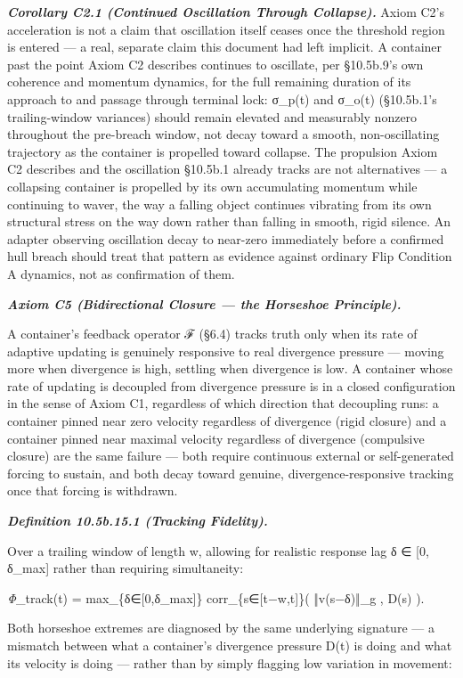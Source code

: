 \documentclass[
]{article}
\begin{document}
\emph{\textbf{Corollary C2.1 (Continued Oscillation Through Collapse).}}
Axiom C2's acceleration is not a claim that oscillation itself ceases
once the threshold region is entered --- a real, separate claim this
document had left implicit. A container past the point Axiom C2
describes continues to oscillate, per §10.5b.9's own coherence and
momentum dynamics, for the full remaining duration of its approach to
and passage through terminal lock: σ\_p(t) and σ\_o(t) (§10.5b.1's
trailing-window variances) should remain elevated and measurably nonzero
throughout the pre-breach window, not decay toward a smooth,
non-oscillating trajectory as the container is propelled toward
collapse. The propulsion Axiom C2 describes and the oscillation §10.5b.1
already tracks are not alternatives --- a collapsing container is
propelled by its own accumulating momentum while continuing to waver,
the way a falling object continues vibrating from its own structural
stress on the way down rather than falling in smooth, rigid silence. An
adapter observing oscillation decay to near-zero immediately before a
confirmed hull breach should treat that pattern as evidence against
ordinary Flip Condition A dynamics, not as confirmation of them.

\emph{\textbf{Axiom C5 (Bidirectional Closure --- the Horseshoe
Principle).}}

A container's feedback operator ℱ (§6.4) tracks truth only when its rate
of adaptive updating is genuinely responsive to real divergence pressure
--- moving more when divergence is high, settling when divergence is
low. A container whose rate of updating is decoupled from divergence
pressure is in a closed configuration in the sense of Axiom C1,
regardless of which direction that decoupling runs: a container pinned
near zero velocity regardless of divergence (rigid closure) and a
container pinned near maximal velocity regardless of divergence
(compulsive closure) are the same failure --- both require continuous
external or self-generated forcing to sustain, and both decay toward
genuine, divergence-responsive tracking once that forcing is withdrawn.

\emph{\textbf{Definition 10.5b.15.1 (Tracking Fidelity).}}

Over a trailing window of length w, allowing for realistic response lag
δ ∈ {[}0, δ\_max{]} rather than requiring simultaneity:

\emph{Φ}\_track(t) = max\_\{δ∈{[}0,δ\_max{]}\} corr\_\{s∈{[}t−w,t{]}\}(
‖v(s−δ)‖\_g , D(s) ).

Both horseshoe extremes are diagnosed by the same underlying signature
--- a mismatch between what a container's divergence pressure D(t) is
doing and what its velocity is doing --- rather than by simply flagging
low variation in movement:
\end{document}
